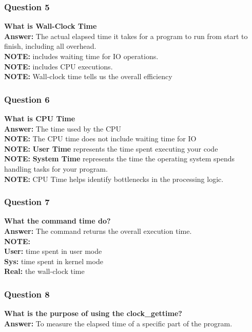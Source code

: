 \documentclass{article}
\begin{document}
\subsubsection*{Question 5}
\textbf{What is Wall-Clock Time} \\
\textbf{Answer:} The actual elapsed time it takes for a program to run from start to finish, including all overhead. \\
\textbf{NOTE:} includes waiting time for IO operations. \\
\textbf{NOTE:} includes CPU executions. \\
\textbf{NOTE:} Wall-clock time tells us the overall efficiency

\subsubsection*{Question 6}
\textbf{What is CPU Time} \\
\textbf{Answer:} The time used by the CPU \\
\textbf{NOTE:} The CPU time does not include waiting time for IO \\
\textbf{NOTE:} \textbf{User Time} represents the time spent executing your code \\
\textbf{NOTE:} \textbf{System Time} represents the time the operating system spends handling tasks for your program. \\
\textbf{NOTE:} CPU Time helps identify bottlenecks in the processing logic.

\subsubsection*{Question 7}
\textbf{What the command time do?} \\
\textbf{Answer:} The command returns the overall execution time. \\
\textbf{NOTE:} \\
\textbf{User:} time spent in user mode \\
\textbf{Sys:} time spent in kernel mode \\
\textbf{Real:} the wall-clock time \\

\subsubsection*{Question 8}
\textbf{What is the purpose of using the clock\_gettime?} \\
\textbf{Answer:} To measure the elapsed time of a specific part of the program.
\end{document}
